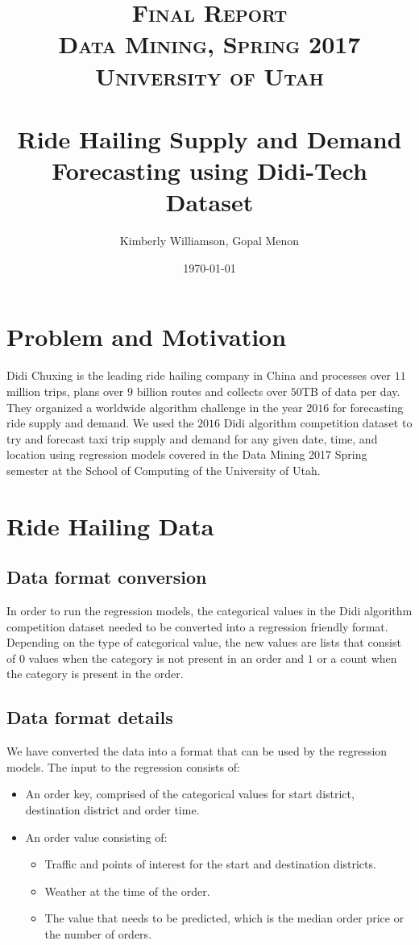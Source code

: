 \documentclass[paper=a4, fontsize=11pt]{scrartcl} %
\title{	
\normalfont \normalsize 
\textsc{Final Report\\Data Mining, Spring 2017\\University of Utah} \\ [25pt] %
\horrule{0.5pt} \\[0.4cm] %
\huge Ride Hailing Supply and Demand Forecasting using Didi-Tech Dataset  %
\horrule{2pt} \\[0.5cm] %
}
\author{Kimberly Williamson, Gopal Menon} %
\date{\normalsize\today} %
\numberwithin{equation}{section} %
\numberwithin{table}{section} %
\begin{document}
\maketitle %


\section{Problem and Motivation}
Didi Chuxing is the leading ride hailing company in China and processes over $11$ million trips, plans over $9$ billion routes and collects over $50$TB of data per day. They organized a worldwide algorithm challenge in the year $2016$ \cite{DidiPage} for forecasting ride supply and demand. We used the $2016$ Didi algorithm competition dataset to try and forecast taxi trip supply and demand for any given date, time, and location using regression models covered in the Data Mining 2017 Spring semester at the School of Computing of the University of Utah.

\section{Ride Hailing Data}

\subsection{Data format conversion}

In order to run the regression models, the categorical values in the Didi algorithm competition dataset needed to be converted into a regression friendly format. Depending on the type of categorical value, the new values are lists that consist of $0$ values when the category is not present in an order and $1$ or a count when the category is present in the order.

\subsection{Data format details}

We have converted the data into a format that can be used by the regression models. The input to the regression consists of:
\begin{itemize}
\item An order key, comprised of the categorical values for start district, destination district and order time.
\item An order value consisting of:
\begin{itemize}
\item Traffic and points of interest for the start and destination districts.
\item Weather at the time of the order.
\item The value that needs to be predicted, which is the median order price or the number of orders.
\end{itemize}
\end{itemize}
\end{document}
